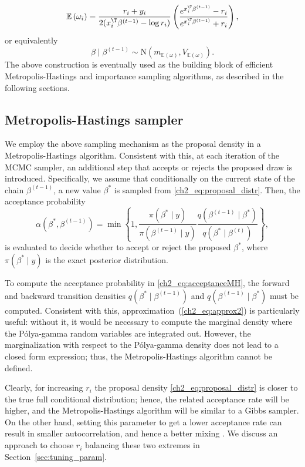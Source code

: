 % 
\begin{equation*}
\mathbb{E}\left(\omega_i\right) = \frac{r_i+y_i}{2(x_i^\T\beta^{(t-1)}-\log r_i)}\left(\frac{e^{x_i^\T\beta^{(t-1)}}-r_i}{e^{x_i^\T\beta^{(t-1)}}+r_i}\right),
\end{equation*}
or equivalently
\begin{equation}
\beta\mid \beta^{(t-1)} \sim \mathrm{N}(m_{\mathbb{E}(\omega)}, V_{\mathbb{E}(\omega)}).
\label{ch2_eq:proposal_distr}
\end{equation}
The above construction is eventually used as the building block of efficient Metropolis-Hastings and importance sampling algorithms, as described in the following sections.
%

\subsection{Metropolis-Hastings sampler}
\label{ch2_sec:mh}

We employ the above sampling mechanism as the proposal density in a Metropolis-Hastings algorithm. Consistent with this, at each iteration of the MCMC sampler, an additional step that accepts or rejects the proposed draw is introduced. Specifically, we assume that conditionally on the current state of the chain $\beta^{(t-1)}$, a new value $\beta^*$ is sampled from \eqref{ch2_eq:proposal_distr}. Then, the acceptance probability 
\begin{equation}
\alpha(\beta^*,\beta^{(t-1)}) = \min\left\{ 1, \frac{\pi(\beta^*\mid y)}{\pi(\beta^{(t-1)}\mid y)}\frac{q(\beta^{(t-1)}\mid \beta^*)}{q(\beta^{*}\mid \beta^{(t)})} \right\},
\label{ch2_eq:acceptanceMH}
\end{equation}
is evaluated to decide whether to accept or reject the proposed $\beta^*$, where $\pi(\beta^*\mid y)$ is the exact posterior distribution.

%
To compute the acceptance probability in \eqref{ch2_eq:acceptanceMH}, the forward and backward transition densities $q(\beta^*\mid \beta^{(t-1)})$ and $q(\beta^{(t-1)}\mid \beta^*)$ must be computed. Consistent with this,  approximation~(\ref{ch2_eq:approx2}) is particularly useful: without it, it would be necessary to compute the marginal density where the P\'olya-gamma random variables are integrated out. However, the marginalization with respect to the  P\'olya-gamma density does not lead to a closed form expression; thus, the Metropolis-Hastings algorithm cannot be defined. %

Clearly, for increasing $r_i$ the proposal density \eqref{ch2_eq:proposal_distr} is closer to the true full conditional distribution; hence, the related acceptance rate will be higher, and the Metropolis-Hastings algorithm will be similar to a Gibbs sampler. 
On the other hand, setting this parameter to get a lower acceptance rate can result in smaller autocorrelation, and hence a better mixing \parencite{robert2010}. We discuss an approach to choose $r_i$ balancing these two extremes in Section~\ref{sec:tuning_param}.


